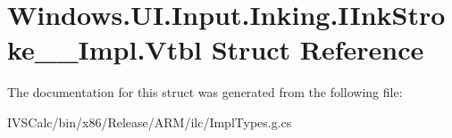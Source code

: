 \hypertarget{struct_windows_1_1_u_i_1_1_input_1_1_inking_1_1_i_ink_stroke_____impl_1_1_vtbl}{}\section{Windows.\+U\+I.\+Input.\+Inking.\+I\+Ink\+Stroke\+\_\+\+\_\+\+Impl.\+Vtbl Struct Reference}
\label{struct_windows_1_1_u_i_1_1_input_1_1_inking_1_1_i_ink_stroke_____impl_1_1_vtbl}


The documentation for this struct was generated from the following file\+:\begin{DoxyCompactItemize}
\item 
I\+V\+S\+Calc/bin/x86/\+Release/\+A\+R\+M/ilc/Impl\+Types.\+g.\+cs\end{DoxyCompactItemize}
